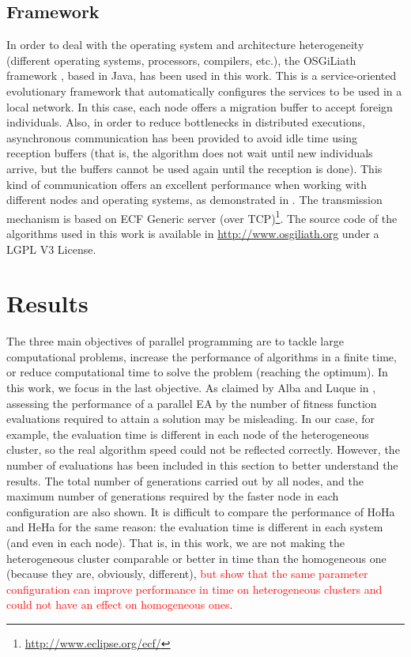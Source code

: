 \documentclass[final,1p,times]{elsarticle}
\begin{document}
\subsection{Framework}
In order to deal with the operating system and architecture heterogeneity (different operating systems, processors, compilers, etc.), the OSGiLiath framework \cite{SOASOCO}, based in Java, has been used in this work. This is a service-oriented evolutionary framework that automatically configures the services to be used in a local network. In this case, each node offers a migration buffer to accept foreign individuals. Also, in order to reduce bottlenecks in distributed executions, asynchronous communication has been provided to avoid idle time using reception buffers (that is, the algorithm does not wait until new individuals arrive, but the buffers cannot be used again until the reception is done). This kind of communication offers an excellent performance when working with different nodes and operating systems, as demonstrated in \cite{HETEROGENEOUSHARD,AsynchronousMerelo08}. The transmission mechanism is based on ECF Generic server (over TCP)\footnote{\url{http://www.eclipse.org/ecf/}}.  The source code of the algorithms used in this work is available in \url{http://www.osgiliath.org} under a LGPL V3 License. 


\section{Results}
\label{sec:results}

The three main objectives of parallel programming are to tackle large computational problems, increase the performance of algorithms in a finite time, or reduce computational time to solve the problem (reaching the optimum). In this work, we focus in the last objective.
As claimed by Alba and Luque in \cite{EVALUATIONPARALLEL}, assessing the performance of a parallel EA by the number of fitness function evaluations required to attain a solution may be misleading. In our case, for example, the evaluation time is different in each node of the heterogeneous cluster, so the real algorithm speed could not be reflected correctly. However, the number of evaluations has been included in this section to better understand the results. The total number of generations carried out by all nodes, and the maximum number of generations required by the faster node in each configuration are also shown. It is difficult to compare the performance of HoHa and HeHa for the same reason: the evaluation time is different in each system (and even in each node). That is, in this work, we are not making the heterogeneous cluster comparable or better in time than the homogeneous one (because they are, obviously, different), \textcolor{red}{but show that the same parameter configuration can improve performance in time on heterogeneous clusters and could not have an effect on homogeneous ones}.
\end{document}
